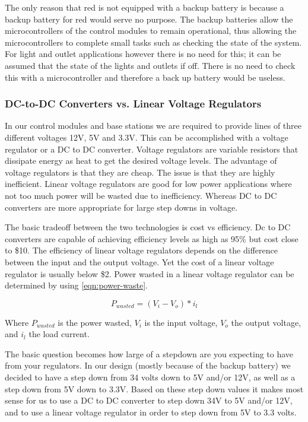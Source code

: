 
The only reason that red is not equipped with a backup battery is because a
backup battery for red would serve no purpose. The backup batteries allow the
microcontrollers of the control modules to remain operational, thus allowing
the microcontrollers to complete small tasks such as checking the state of the
system. For light and outlet applications however there is no need for this; it
can be assumed that the state of the lights and outlets if off.  There is no
need to check this with a microcontroller and therefore a back up battery would
be useless.

\subsubsection{DC-to-DC Converters vs. Linear Voltage Regulators}
In our control modules and base stations we are required to provide lines of
three different voltages 12V, 5V and 3.3V. This can be accomplished with a
voltage regulator or a DC to DC converter. Voltage regulators are variable
resistors that dissipate energy as heat to get the desired voltage levels. The
advantage of voltage regulators is that they are cheap. The issue is that they
are highly inefficient. Linear voltage regulators are good for low power
applications where not too much power will be wasted due to inefficiency.
Whereas DC to DC converters are more appropriate for large step downs in
voltage.

The basic tradeoff between the two technologies is cost vs efficiency. Dc to DC
converters are capable of achieving efficiency levels as high as 95\% but cost
close to \$10. The efficiency of linear voltage regulators depends on the
difference between the input and the output voltage. Yet the cost of a linear
voltage regulator is usually below \$2. Power wasted in a linear voltage
regulator can be determined by using \autoref{eqn:power-waste}.

\begin{equation}
P_{wasted} = (V_i - V_o) * i_l
\label{eqn:power-waste}
\end{equation}

Where $P_{wasted}$ is the power wasted, $V_i$ is the input voltage, $V_o$ the
output voltage, and $i_l$ the load current.

The basic question becomes how large of a stepdown are you expecting to have
from your regulators. In our design (mostly because of the backup battery) we
decided to have a step down from 34 volts down to 5V and/or 12V, as well as a
step down from 5V down to 3.3V. Based on these step down values it makes most
sense for us to use a DC to DC converter to step down 34V to 5V and/or 12V, and
to use a linear voltage regulator in order to step down from 5V to 3.3 volts.

